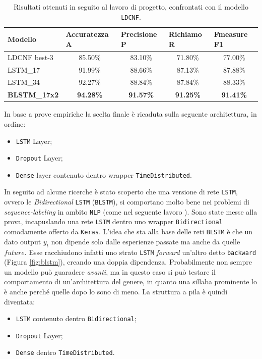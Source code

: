 \documentclass[twoside,twocolumn,10pt]{extarticle}
\theoremstyle{definition}
\begin{document}
		\begin{table}[]
			\centering
			\caption{Risultati ottenuti in seguito al lavoro di progetto, confrontati con il modello \texttt{LDCNF}.}
			\label{tab:results}
			\begin{tabular}{lcccc}
				\hline
				Modello              & \multicolumn{1}{l}{Accuratezza A} & \multicolumn{1}{l}{Precisione P} & \multicolumn{1}{l}{Richiamo R} & \multicolumn{1}{l}{Fmeasure F1} \\ \hline
				LDCNF best-3         & 85.50\%                           & 83.10\%                          & 71.80\%                        & 77.00\%                         \\
				LSTM\_17             & 91.99\%                           & 88.66\%                          & 87.13\%                        & 87.88\%                         \\
				LSTM\_34             & 92.27\%                           & 88.84\%                          & 87.84\%                        & 88.33\%                         \\
				\textbf{BLSTM\_17x2} & \textbf{94.28\%}                  & \textbf{91.57\%}                 & \textbf{91.25\%}               & \textbf{91.41\%}                \\ \hline
			\end{tabular}
		\end{table}
		In base a prove empiriche la scelta finale è ricaduta sulla seguente architettura, in ordine:
		\begin{itemize}
			\item \texttt{LSTM} Layer;
			\item \texttt{Dropout} Layer;
			\item \texttt{Dense} layer contenuto dentro wrapper \texttt{TimeDistributed}.
		\end{itemize}
		In seguito ad alcune ricerche è stato scoperto che una versione di rete \texttt{LSTM}, ovvero le \textit{Bidirectional} \texttt{LSTM} (\texttt{BLSTM}), si comportano molto bene nei problemi di \textit{sequence-labeling} in ambito \texttt{NLP} (come nel seguente lavoro \cite[Capitolo 5]{bib:blstm}). Sono state messe alla prova, incapuslando una rete \texttt{LSTM} dentro uno wrapper \texttt{Bidirectional} comodamente offerto da \texttt{Keras}. L'idea che sta alla base delle reti \texttt{BLSTM} è che un dato output $y_t$ non dipende solo dalle esperienze passate ma anche da quelle $future$. Esse racchiudono infatti uno strato \texttt{LSTM} \textit{forward} un'altro detto \texttt{backward} (Figura \ref{fig:blstm}), creando una doppia dipendenza. Probabilmente non sempre un modello può guaradere \textit{avanti}, ma in questo caso si può testare il comportamento di un'architettura del genere, in quanto una sillaba prominente lo è anche perché quelle dopo lo sono di meno. La struttura a pila è quindi diventata:
		\begin{itemize}
			\item \texttt{LSTM} contenuto dentro \texttt{Bidirectional};
			\item \texttt{Dropout} Layer;
			\item \texttt{Dense} dentro \texttt{TimeDistributed}.
		\end{itemize}
	
\end{document}
